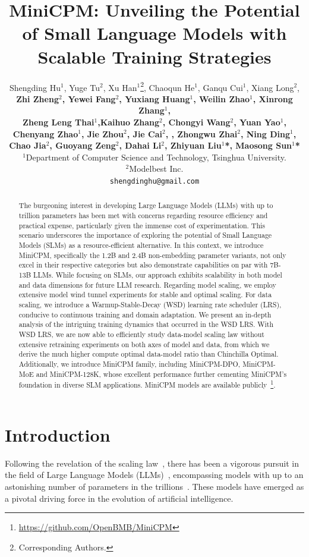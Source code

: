 \documentclass[dvipsnames]{article}
\title{MiniCPM: Unveiling the Potential of Small Language Models with Scalable Training Strategies}
\author{Shengding Hu$^1$, Yuge Tu$^2$, Xu Han$^1$\thanks{Corresponding Authors.}, Chaoqun He$^1$, Ganqu Cui$^1$, Xiang Long$^2$,\\ \textbf{Zhi Zheng$^2$, Yewei Fang$^2$, Yuxiang Huang$^1$, Weilin Zhao$^1$, Xinrong Zhang$^1$,   } \\ \textbf{Zheng Leng Thai$^1$,Kaihuo Zhang$^2$, Chongyi Wang$^2$, Yuan Yao$^1$, } \\\textbf{ Chenyang Zhao$^1$, Jie Zhou$^2$, Jie Cai$^2$, , Zhongwu Zhai$^2$, Ning Ding$^1$, } \\\textbf{Chao Jia$^2$, Guoyang Zeng$^2$, Dahai Li$^2$, Zhiyuan Liu$^1$*, Maosong Sun$^1$*} \\
$^1$Department of Computer Science and Technology, Tsinghua University. \quad 
\\ 
$^2$Modelbest Inc.\\
\texttt{shengdinghu@gmail.com}
}
\begin{document}
\maketitle
\begin{abstract}
The burgeoning interest in developing Large Language Models (LLMs) with up to trillion parameters has been met with concerns regarding resource efficiency and practical expense, particularly given the immense cost of experimentation. This scenario underscores the importance of exploring the potential of Small Language Models (SLMs) as a resource-efficient alternative. In this context, we introduce MiniCPM, specifically the 1.2B and 2.4B non-embedding parameter variants, not only excel in their respective categories but also demonstrate capabilities on par with 7B-13B LLMs. While focusing on SLMs, our approach exhibits scalability in both model and data dimensions for future LLM research. Regarding model scaling, we employ extensive model wind tunnel experiments for stable and optimal scaling. For data scaling, we introduce a Warmup-Stable-Decay (WSD) learning rate scheduler (LRS), conducive to continuous training and domain adaptation. We present an in-depth analysis of the intriguing training dynamics that occurred in the WSD LRS. With WSD LRS, we are now able to efficiently study data-model scaling law without extensive retraining experiments on both axes of model and data, from which we derive the much higher compute optimal data-model ratio than Chinchilla Optimal. Additionally, we introduce MiniCPM family, including MiniCPM-DPO, MiniCPM-MoE and MiniCPM-128K, whose excellent performance further cementing MiniCPM's foundation in diverse SLM applications. MiniCPM models are available publicly~\footnote{\url{https://github.com/OpenBMB/MiniCPM}}.

\end{abstract}

\section{Introduction}

Following the revelation of the scaling law~\citep{kaplan2020scaling}, there has been a vigorous pursuit in the field of Large Language Models (LLMs)~\citep{hoffmann2022training, bai2023qwen, team2023gemini, chowdhery2023palm, achiam2023gpt}, encompassing models with up to an astonishing number of parameters in the trillions~\citep{fedus2022switch}. These models have emerged as a pivotal driving force in the evolution of artificial intelligence.
\end{document}
